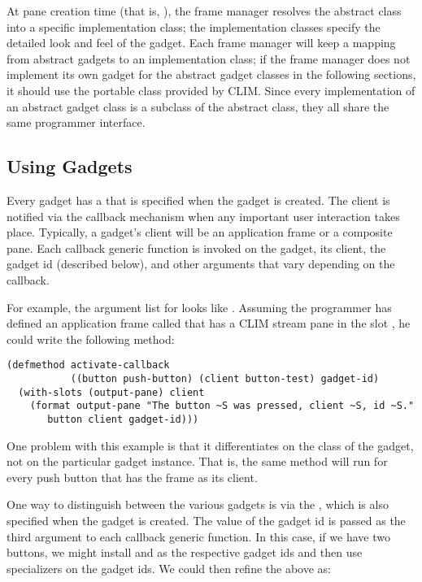 At pane creation time (that is, ), the frame manager resolves the
abstract class into a specific implementation class; the implementation classes
specify the detailed look and feel of the gadget.  Each frame manager will keep
a mapping from abstract gadgets to an implementation class; if the frame manager
does not implement its own gadget for the abstract gadget classes in the
following sections, it should use the portable class provided by CLIM.  Since
every implementation of an abstract gadget class is a subclass of the abstract
class, they all share the same programmer interface.


\subsection {Using Gadgets}

Every gadget has a  that is specified when the gadget is
created.  The client is notified via the callback mechanism when any important
user interaction takes place.   Typically, a gadget's client will be an
application frame or a composite pane.  Each callback generic function is
invoked on the gadget, its client, the gadget id (described below), and other
arguments that vary depending on the callback.

For example, the argument list for  looks like
.  Assuming the programmer has defined an
application frame called  that has a CLIM stream pane in the
slot , he could write the following method:

\begin{verbatim}
(defmethod activate-callback
           ((button push-button) (client button-test) gadget-id) 
  (with-slots (output-pane) client
    (format output-pane "The button ~S was pressed, client ~S, id ~S."
       button client gadget-id)))
\end{verbatim}

One problem with this example is that it differentiates on the class of the
gadget, not on the particular gadget instance.  That is, the same method will
run for every push button that has the  frame as its client.

One way to distinguish between the various gadgets is via the , which is also specified when the gadget is created.  The value of the
gadget id is passed as the third argument to each callback generic function.  In
this case, if we have two buttons, we might install  and  as
the respective gadget ids and then use  specializers on the gadget ids.
We could then refine the above as:

